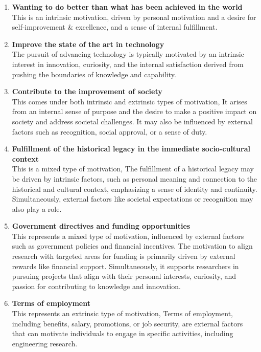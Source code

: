 \documentclass{article}
\begin{document}
	\begin{enumerate}[label=\roman*)]
		\item \textbf{Wanting to do better than what has been achieved in the world} \\
		This is an intrinsic motivation, driven by personal motivation and a desire for self-improvement \&
		excellence, and a sense of internal fulfillment.

		\item \textbf{Improve the state of the art in technology} \\
		The pursuit of advancing technology is typically motivated by an intrinsic interest in innovation,
		curiosity, and the internal satisfaction derived from pushing the boundaries of knowledge and
		capability.

		\item \textbf{Contribute to the improvement of society} \\
		This comes under both intrinsic and extrinsic types of motivation, It arises from an internal sense of
		purpose and the desire to make a positive impact on society and address societal challenges.
		It may also be influenced by external factors such as recognition, social approval, or a sense of duty.
		
		\item \textbf{Fulfillment of the historical legacy in the immediate socio-cultural context} \\
		This is a mixed type of motivation, The fulfillment of a historical legacy may be driven by intrinsic
		factors, such as personal meaning and connection to the historical and cultural context, emphasizing a
		sense of identity and continuity. Simultaneously, external factors like societal expectations or
		recognition may also play a role.
		
		\item \textbf{Government directives and funding opportunities} \\
		This represents a mixed type of motivation, influenced by external factors such as government policies
		and financial incentives.
		The motivation to align research with targeted areas for funding is primarily driven by external
		rewards like financial support.
		Simultaneously, it supports researchers in pursuing projects that align with their personal interests,
		curiosity, and passion for contributing to knowledge and innovation.
		
		\item \textbf{Terms of employment} \\
		This represents an extrinsic type of motivation, Terms of employment, including benefits, salary,
		promotions, or job security, are external factors that can motivate individuals to engage in specific
		activities, including engineering research.
	\end{enumerate}
\end{document}
